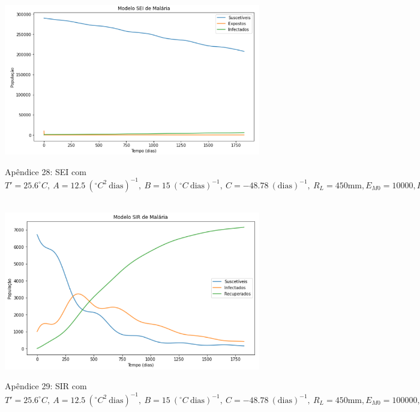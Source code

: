 \documentclass[12pt]{article}
\begin{document}
\begin{figure}[!ht]
        \centering
        \hbox{\hspace{2.5em} \includegraphics[scale=0.7] {SEI_Entrada_Pop_10000_500_Infect.png}}
        \caption*{Apêndice 28: SEI com $T'=25.6^\circ C, \ A=12.5 \ (^\circ C^2 \ \text{dias})^{-1}, \ B=15 \ (^\circ C \ \text{dias})^{-1}, \ C=-48.78 \ (\text{dias})^{-1}, \ R_L=450 \text{mm}, E_{M0}=10000, I_{H0}=500$} 
\end{figure} 
\newpage
\begin{figure}[!ht]
        \centering
        \hbox{\hspace{2.7em} \includegraphics[scale=0.7] {SIR_Entrada_Pop_100000_1000_Infect.png}}
        \caption*{Apêndice 29: SIR com $T'=25.6^\circ C, \ A=12.5 \ (^\circ C^2 \ \text{dias})^{-1}, \ B=15 \ (^\circ C \ \text{dias})^{-1}, \ C=-48.78 \ (\text{dias})^{-1}, \ R_L=450 \text{mm}, E_{M0}=100000, I_{H0}=1000$} 
\end{figure} 
\end{document}
